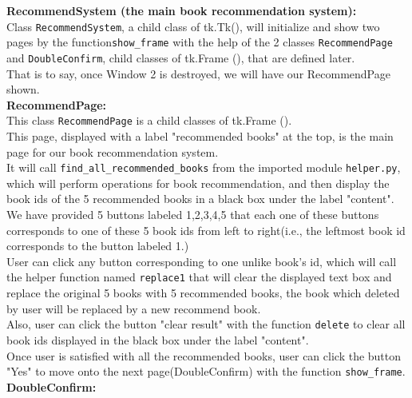 \documentclass[fontsize=11pt]{article}
\begin{document}
\textbf{RecommendSystem (the main book recommendation system):}\\

Class \texttt{RecommendSystem}, a child class of tk.Tk(), will initialize and show two pages by the function\texttt{show\_frame} with the help of the 2 classes \texttt{RecommendPage} and \texttt{DoubleConfirm}, child classes of tk.Frame (), that are defined later.\\
That is to say, once Window 2 is destroyed, we will have our RecommendPage shown.\\

\textbf{RecommendPage:}\\

This class \texttt{RecommendPage} is a child classes of tk.Frame ().\\

This page, displayed with a label "recommended books" at the top, is the main page for our book recommendation system.\\
It will call \texttt{find\_all\_recommended\_books} from the imported module \texttt{helper.py}, which will perform operations for book recommendation, and then display the book ids of the 5 recommended books in a black box under the label "content".\\

We have provided 5 buttons labeled 1,2,3,4,5 that each one of these buttons corresponds to one of these 5 book ids from left to right(i.e., the leftmost book id corresponds to the button labeled 1.)\\

User can click any button corresponding to one unlike book's id, which will call the helper function named \texttt{replace1} that will clear the displayed text box and replace the original 5 books with 5 recommended books, the book which deleted by user will be replaced by a new recommend book.\\

Also, user can click the button "clear result" with the function \texttt{delete} to clear all book ids displayed in the black box under the label "content".\\

Once user is satisfied with all the recommended books, user can click the button "Yes" to move onto the next page(DoubleConfirm) with the function \texttt{show\_frame}.\\

\textbf{DoubleConfirm:}\\
\end{document}
